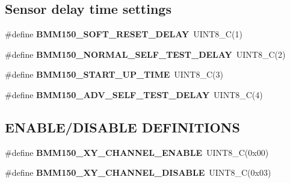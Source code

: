 \subsection*{Sensor delay time settings}
\begin{DoxyCompactItemize}
\item 
\mbox{\label{group___b_m_m150_gae444e3a85c42d159494a3aaa009acf96}} 
\#define {\bfseries B\+M\+M150\+\_\+\+S\+O\+F\+T\+\_\+\+R\+E\+S\+E\+T\+\_\+\+D\+E\+L\+AY}~U\+I\+N\+T8\+\_\+C(1)
\item 
\mbox{\label{group___b_m_m150_gaec6af2af456b44f31f53c69235028ed6}} 
\#define {\bfseries B\+M\+M150\+\_\+\+N\+O\+R\+M\+A\+L\+\_\+\+S\+E\+L\+F\+\_\+\+T\+E\+S\+T\+\_\+\+D\+E\+L\+AY}~U\+I\+N\+T8\+\_\+C(2)
\item 
\mbox{\label{group___b_m_m150_gaf14f592affbc3c378989438565e1021e}} 
\#define {\bfseries B\+M\+M150\+\_\+\+S\+T\+A\+R\+T\+\_\+\+U\+P\+\_\+\+T\+I\+ME}~U\+I\+N\+T8\+\_\+C(3)
\item 
\mbox{\label{group___b_m_m150_ga8971ae38df387b4423cd88b82aa2342d}} 
\#define {\bfseries B\+M\+M150\+\_\+\+A\+D\+V\+\_\+\+S\+E\+L\+F\+\_\+\+T\+E\+S\+T\+\_\+\+D\+E\+L\+AY}~U\+I\+N\+T8\+\_\+C(4)
\end{DoxyCompactItemize}
\subsection*{E\+N\+A\+B\+L\+E/\+D\+I\+S\+A\+B\+LE D\+E\+F\+I\+N\+I\+T\+I\+O\+NS}
\begin{DoxyCompactItemize}
\item 
\mbox{\label{group___b_m_m150_gaaf00be9e69422a82831aa42631ba8899}} 
\#define {\bfseries B\+M\+M150\+\_\+\+X\+Y\+\_\+\+C\+H\+A\+N\+N\+E\+L\+\_\+\+E\+N\+A\+B\+LE}~U\+I\+N\+T8\+\_\+C(0x00)
\item 
\mbox{\label{group___b_m_m150_ga2f287eb0d76864537f15213886090aff}} 
\#define {\bfseries B\+M\+M150\+\_\+\+X\+Y\+\_\+\+C\+H\+A\+N\+N\+E\+L\+\_\+\+D\+I\+S\+A\+B\+LE}~U\+I\+N\+T8\+\_\+C(0x03)
\end{DoxyCompactItemize}
